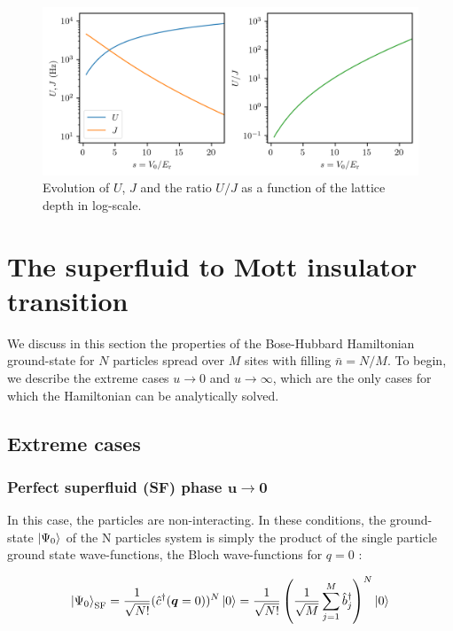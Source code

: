 \begin{figure}
    \centering
    \includegraphics[width=\textwidth]{Fig/Chapter2/U_J_vs_s.png}
    \caption[Evolution of $U$, $J$ and the ratio $U/J$ as a function of the lattice depth in log-scale]{Evolution of $U$, $J$ and the ratio $U/J$ as a function of the lattice depth in log-scale.}
    \label{fig:U_J_vs_s}
\end{figure}

\section{The superfluid to Mott insulator transition}

We discuss in this section the properties of the Bose-Hubbard Hamiltonian ground-state for $N$ particles spread over $M$ sites with filling $\bar{n}=N/M$. To begin, we describe the extreme cases $u \to 0$ and $u \to \infty$, which are the only cases for which the Hamiltonian can be analytically solved. 

\subsection{Extreme cases}

\subsubsection{Perfect superfluid (SF) phase $\bm{u \to 0}$}

In this case, the particles are non-interacting. In these conditions, the ground-state $\ket{\Psi_0}$ of the N particles system is simply the product of the single particle ground state wave-functions, \ie the Bloch wave-functions for $q=0$ \cite{bloch2008many}:

\begin{equation}
    \ket{\Psi_0}_{\mathrm{SF}} = \frac{1}{\sqrt{N!}} (\hat{c}^{\dagger}(\bm{q}=0))^N \ket{0} = \frac{1}{\sqrt{N !}}\left(\frac{1}{\sqrt{M}} \sum_{j=1}^{M} \hat{b}_{j}^{\dagger}\right)^{N} \ket{0}
\end{equation}

